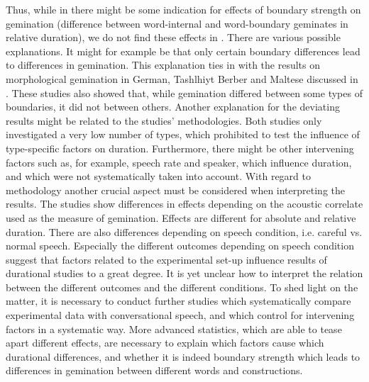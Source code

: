 Thus, while in \cite{Oh.2012} there might be some indication for effects of boundary strength on gemination (difference between word-internal and word-boundary geminates in relative duration), we do not find these effects in \cite{Oh.2013}. There are various possible explanations. 
It might for example be that only certain boundary differences lead to differences in gemination. This explanation ties in with the results on morphological gemination in German, Tashlhiyt Berber and Maltese discussed in . These studies also showed that, while gemination differed between some types of boundaries, it did not between others. 
Another explanation for the deviating results might be related to the studies' methodologies.  
Both studies only investigated a very low number of types, which prohibited to test the influence of type-specific factors on duration. Furthermore, there might be other intervening factors such as, for example, speech rate and speaker, which influence duration, and which were not systematically  taken into account. 
With regard to methodology another crucial aspect must be considered when interpreting the results.
The studies show differences in effects depending on the acoustic correlate used as the measure of gemination. Effects are different for absolute and relative duration. There are also differences depending on speech condition, i.e. careful vs. normal speech. 
Especially the different outcomes depending on speech condition suggest that factors related to the experimental set-up influence results of durational studies to a great degree. It is yet unclear how to interpret the relation between the different outcomes and the different conditions.
To shed light on the matter, it is necessary to conduct further studies which systematically compare experimental data with conversational speech, and which control for intervening factors in a systematic way. More advanced statistics, which are able to tease apart different effects, are necessary to explain which factors cause which durational differences, and whether it is indeed boundary strength which leads to differences in gemination between different words and constructions.



